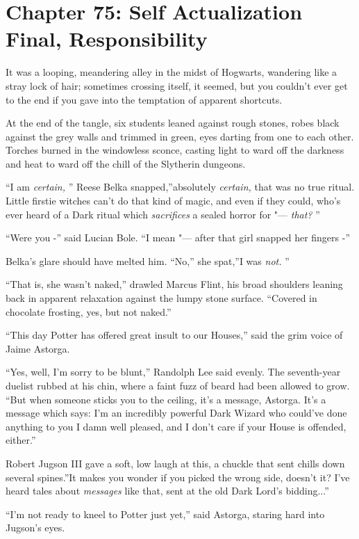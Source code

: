 \chapter{Chapter 75: Self Actualization Final, Responsibility}
It was a looping, meandering alley in the midst of Hogwarts, wandering
like a stray lock of hair; sometimes crossing itself, it seemed, but you
couldn't ever get to the end if you gave into the temptation of apparent
shortcuts.

At the end of the tangle, six students leaned against rough stones,
robes black against the grey walls and trimmed in green, eyes darting
from one to each other. Torches burned in the windowless sconce, casting
light to ward off the darkness and heat to ward off the chill of the
Slytherin dungeons.

``I am \emph{certain,} '' Reese Belka snapped,''absolutely \emph{certain,}
that was no true ritual. Little firstie witches can't do that kind of
magic, and even if they could, who's ever heard of a Dark ritual which
\emph{sacrifices} a sealed horror for "--- \emph{that?} ''

``Were you -'' said Lucian Bole. ``I mean "--- after that girl snapped her
fingers -''

Belka's glare should have melted him. ``No,'' she spat,''I was
\emph{not.} ''

``That is, she wasn't naked,'' drawled Marcus Flint, his broad shoulders
leaning back in apparent relaxation against the lumpy stone surface.
``Covered in chocolate frosting, yes, but not naked.''

``This day Potter has offered great insult to our Houses,'' said the
grim voice of Jaime Astorga.

``Yes, well, I'm sorry to be blunt,'' Randolph Lee said evenly. The
seventh-year duelist rubbed at his chin, where a faint fuzz of beard had
been allowed to grow. ``But when someone sticks you to the ceiling, it's
a message, Astorga. It's a message which says: I'm an incredibly
powerful Dark Wizard who could've done anything to you I damn well
pleased, and I don't care if your House is offended, either.''

Robert Jugson III gave a soft, low laugh at this, a chuckle that sent
chills down several spines.''It makes you wonder if you picked the wrong
side, doesn't it? I've heard tales about \emph{messages} like that, sent
at the old Dark Lord's bidding...''

``I'm not ready to kneel to Potter just yet,'' said Astorga, staring
hard into Jugson's eyes.

